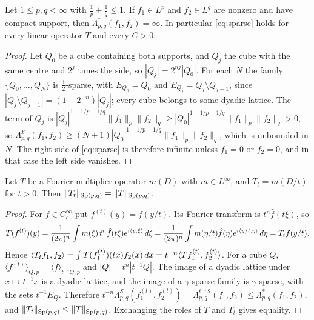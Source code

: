 \begin{lemma}\label{lem:trivialsparse}
Let $1\le p,q<\infty$ with $\frac1p+\frac1q\le1$. If $f_1\in L^p$ and $f_2\in L^q$ are nonzero and
have compact support, then $\Lambda^*_{p,q}(f_1,f_2)=\infty$. In particular \eqref{eq:sparse} holds for
every linear operator $T$ and every $C>0$.
\end{lemma}

\begin{proof}
Let $Q_0$ be a cube containing both supports, and $Q_j$ the cube with the same centre and $2^j$
times the side, so $|Q_j|=2^{nj}|Q_0|$. For each $N$ the family $\{Q_0,\dots,Q_N\}$ is
$\frac12$-sparse, with $E_{Q_0}=Q_0$ and $E_{Q_j}=Q_j\setminus Q_{j-1}$, since
$|Q_j\setminus Q_{j-1}|=(1-2^{-n})|Q_j|$; every cube belongs to some dyadic lattice. The term of
$Q_j$ is $|Q_j|^{1-1/p-1/q}\|f_1\|_p\|f_2\|_q\ge|Q_0|^{1-1/p-1/q}\|f_1\|_p\|f_2\|_q>0$, so
$\Lambda^{\mathcal S}_{p,q}(f_1,f_2)\ge(N+1)|Q_0|^{1-1/p-1/q}\|f_1\|_p\|f_2\|_q$, which is unbounded
in $N$. The right side of \eqref{eq:sparse} is therefore infinite unless $f_1=0$ or $f_2=0$, and
in that case the left side vanishes.
\end{proof}

\begin{lemma}\label{lem:dilation}
Let $T$ be a Fourier multiplier operator $m(D)$ with $m\in L^\infty$, and $T_t=m(D/t)$ for $t>0$.
Then $\|T_t\|_{\mathrm{Sp}(p,q)}=\|T\|_{\mathrm{Sp}(p,q)}$.
\end{lemma}

\begin{proof}
For $f\in C^\infty_c$ put $f^{(t)}(y)=f(y/t)$. Its Fourier transform is $t^n\hat f(t\xi)$, so
\[
T(f^{(t)})(y)=\frac1{(2\pi)^n}\int m(\xi)\,t^n\hat f(t\xi)e^{i\langle y,\xi\rangle}\,d\xi
=\frac1{(2\pi)^n}\int m(\eta/t)\hat f(\eta)e^{i\langle y/t,\eta\rangle}\,d\eta=T_tf(y/t).
\]
Hence $\langle T_tf_1,f_2\rangle=\int T(f_1^{(t)})(tx)f_2(x)\,dx=t^{-n}\langle Tf_1^{(t)},f_2^{(t)}\rangle$. For a cube $Q$,
$\langle f^{(t)}\rangle_{Q,p}=\langle f\rangle_{t^{-1}Q,p}$ and $|Q|=t^n|t^{-1}Q|$. The image of a dyadic
lattice under $x\mapsto t^{-1}x$ is a dyadic lattice, and the image of a $\gamma$-sparse family is
$\gamma$-sparse, with the sets $t^{-1}E_Q$. Therefore
$t^{-n}\Lambda^{\mathcal S}_{p,q}(f_1^{(t)},f_2^{(t)})=\Lambda^{t^{-1}\mathcal S}_{p,q}(f_1,f_2)\le\Lambda^*_{p,q}(f_1,f_2)$,
and $\|T_t\|_{\mathrm{Sp}(p,q)}\le\|T\|_{\mathrm{Sp}(p,q)}$. Exchanging the roles of $T$ and $T_t$ gives equality.
\end{proof}

